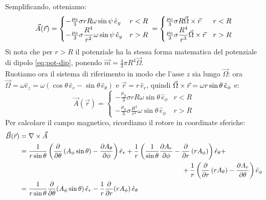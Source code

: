 \documentclass[]{article}
\begin{document}
Semplificando, otteniamo:
\begin{equation}
	\vec{A}(\vec{r}) =
	\begin{cases}
		-\frac{\mu_0}{3} \sigma r R \omega \sin\psi \,\hat{e}_y & r < R \\ 
		-\frac{\mu_0}{3} \sigma \displaystyle\frac{R^4}{r^2} \omega \sin\psi \,\hat{e}_y & r > R
	\end{cases}
	\,=
	\begin{cases}
		\frac{\mu_0}{3} \sigma R \vec{\Omega}\times\vec{r} & r < R \\ 
		\frac{\mu_0}{3} \sigma \displaystyle\frac{R^4}{r^3} \vec{\Omega}\times\vec{r} & r > R
	\end{cases}
	\label{eq:po-sf}
\end{equation}
Si nota che per $ r > R $ il potenziale ha la stessa forma matematica del potenziale di dipolo \ref{eq:pot-dip}, ponendo $ \vec{m} = \frac{4}{3} \pi R^4 \vec{\Omega} $. \\ 
%
Ruotiamo ora il sistema di riferimento in modo che l'asse $ z $ sia lungo $ \vec{\Omega} $: ora $ \vec{\Omega} = \omega \hat{e}_z = \omega (\cos\theta \,\hat{e}_r - \sin\theta \,\hat{e}_{\theta}) $ e $ \vec{r} = r \,\hat{e}_r $, quindi $ \vec{\Omega}\times\vec{r} = \omega r \sin\theta \,\hat{e}_{\phi} $ e:
\begin{equation}
	\vec{A}(\vec{r}) =
	\begin{cases}
		-\frac{\mu_0}{3} \sigma r R \omega \sin\theta \,\hat{e}_{\phi} & r < R \\ 
		-\frac{\mu_0}{3} \sigma \displaystyle\frac{R^4}{r^2} \omega \sin\theta \,\hat{e}_{\phi} & r > R
	\end{cases}
	\label{eq:}
\end{equation}
Per calcolare il campo magnetico, ricordiamo il rotore in coordinate sferiche:
\begin{equation}
	\begin{split}
		\vec{B}(\vec{r}) &= \nabla\times\vec{A} \\ 
				 &= \displaystyle\frac{1}{r\sin\theta} \left( \displaystyle\frac{\partial}{\partial\theta} \left( A_{\phi} \sin\theta \right) - \displaystyle\frac{\partial A_{\theta}}{\partial\phi} \right) \hat{e}_r + \displaystyle\frac{1}{r} \left( \displaystyle\frac{1}{\sin\theta} \displaystyle\frac{\partial A_r}{\partial\phi} - \displaystyle\frac{\partial}{\partial r} \left(r A_{\phi} \right)\right) \hat{e}_{\theta} + \\ 
				 & \qquad\qquad\qquad\qquad\qquad\qquad\qquad\qquad\qquad\qquad\qquad\qquad + \displaystyle\frac{1}{r} \left(\displaystyle\frac{\partial}{\partial r} \left( r A_{\theta} \right) - \displaystyle\frac{\partial A_r}{\partial\theta} \right) \hat{e}_{\phi} \\ 
				 &= \displaystyle\frac{1}{r\sin\theta}\displaystyle\frac{\partial}{\partial\theta}(A_{\phi} \sin\theta) \,\hat{e}_r - \displaystyle\frac{1}{r}\displaystyle\frac{\partial}{\partial r} (rA_{\phi}) \,\hat{e}_{\theta}
	\end{split}
	\label{eq:}
\end{equation}
\end{document}
